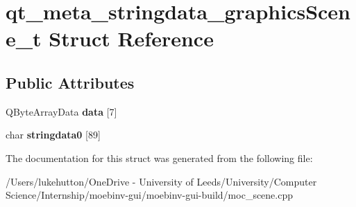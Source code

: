 \hypertarget{structqt__meta__stringdata__graphics_scene__t}{}\section{qt\+\_\+meta\+\_\+stringdata\+\_\+graphics\+Scene\+\_\+t Struct Reference}
\label{structqt__meta__stringdata__graphics_scene__t}
\subsection*{Public Attributes}
\begin{DoxyCompactItemize}
\item 
\mbox{\label{structqt__meta__stringdata__graphics_scene__t_a9cc8896a17a0667e790b40b5111c70aa}} 
Q\+Byte\+Array\+Data {\bfseries data} \mbox{[}7\mbox{]}
\item 
\mbox{\label{structqt__meta__stringdata__graphics_scene__t_a192f9146e5f62ea8345ecbfbc9909e8b}} 
char {\bfseries stringdata0} \mbox{[}89\mbox{]}
\end{DoxyCompactItemize}


The documentation for this struct was generated from the following file\+:\begin{DoxyCompactItemize}
\item 
/\+Users/lukehutton/\+One\+Drive -\/ University of Leeds/\+University/\+Computer Science/\+Internship/moebinv-\/gui/moebinv-\/gui-\/build/moc\+\_\+scene.\+cpp\end{DoxyCompactItemize}
